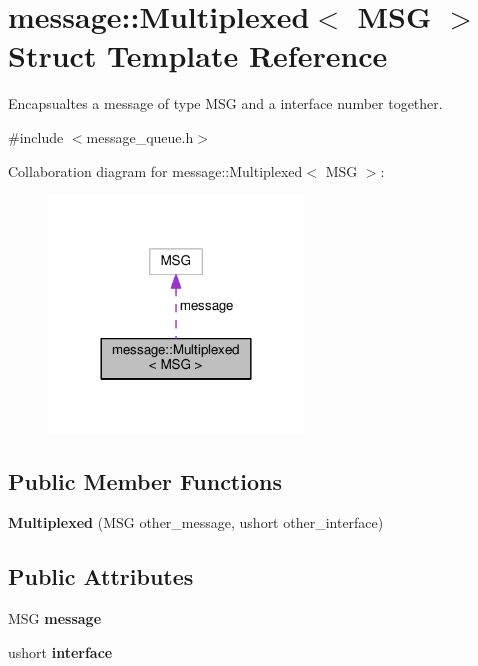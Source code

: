 \hypertarget{structmessage_1_1Multiplexed}{}\section{message\+:\+:Multiplexed$<$ M\+SG $>$ Struct Template Reference}
\label{structmessage_1_1Multiplexed}


Encapsualtes a message of type M\+SG and a interface number together.  




{\ttfamily \#include $<$message\+\_\+queue.\+h$>$}



Collaboration diagram for message\+:\+:Multiplexed$<$ M\+SG $>$\+:\nopagebreak
\begin{figure}[H]
\begin{center}
\leavevmode
\includegraphics[width=192pt]{structmessage_1_1Multiplexed__coll__graph}
\end{center}
\end{figure}
\subsection*{Public Member Functions}
\begin{DoxyCompactItemize}
\item 
{\bfseries Multiplexed} (M\+SG other\+\_\+message, ushort other\+\_\+interface)\hypertarget{structmessage_1_1Multiplexed_ac93f435186dd43948070bfe4dbe5fcd2}{}\label{structmessage_1_1Multiplexed_ac93f435186dd43948070bfe4dbe5fcd2}

\end{DoxyCompactItemize}
\subsection*{Public Attributes}
\begin{DoxyCompactItemize}
\item 
M\+SG {\bfseries message}\hypertarget{structmessage_1_1Multiplexed_afa6592047ba3b8ca1d82000e862dd8a8}{}\label{structmessage_1_1Multiplexed_afa6592047ba3b8ca1d82000e862dd8a8}

\item 
ushort {\bfseries interface}\hypertarget{structmessage_1_1Multiplexed_a3c1897b89f1649045e2ab89ad9007c7f}{}\label{structmessage_1_1Multiplexed_a3c1897b89f1649045e2ab89ad9007c7f}

\end{DoxyCompactItemize}


